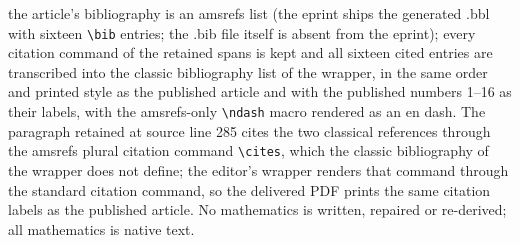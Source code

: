 \documentclass[10pt,a4paper]{amsart}
\begin{document}
the article's bibliography is an amsrefs list (the eprint ships the generated .bbl with sixteen \texttt{\textbackslash bib} entries; the .bib file itself is absent from the eprint); every citation command of the retained spans is kept and all sixteen cited entries are transcribed into the classic bibliography list of the wrapper, in the same order and printed style as the published article and with the published numbers 1--16 as their labels, with the amsrefs-only \texttt{\textbackslash ndash} macro rendered as an en dash. The paragraph retained at source line 285 cites the two classical references \cite{avram-et-al_2007,loeffen_2008} through the amsrefs plural citation command \texttt{\textbackslash cites}, which the classic bibliography of the wrapper does not define; the editor's wrapper renders that command through the standard citation command, so the delivered PDF prints the same citation labels as the published article. No mathematics is written, repaired or re-derived; all mathematics is native text.
\end{document}
